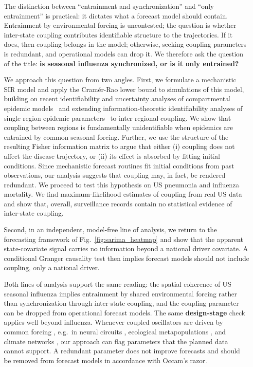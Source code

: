 \documentclass[11pt]{article}
\begin{document}
The distinction between ``entrainment and synchronization'' and ``only
entrainment'' is practical: it dictates what a forecast model should
contain. Entrainment by environmental forcing is uncontested; the
question is whether inter-state coupling contributes identifiable
structure to the trajectories. If it does, then coupling belongs in
the model; otherwise, seeking coupling parameters is redundant, and
operational models can drop it. We therefore ask the question of the
title: \textbf{is seasonal influenza synchronized, or is it only
  entrained?}


We approach this question from two angles. First, we formulate a
mechanistic SIR model and apply the Cram\'er-Rao lower bound to
simulations of this model, building on recent identifiability and
uncertainty analyses of compartmental epidemic
models~\citep{edeling2021, kharazmi2021} and extending
information-theoretic identifiability analyses of single-region
epidemic parameters~\citep{parag2022} to inter-regional coupling. We show that
coupling between regions is fundamentally unidentifiable when
epidemics are entrained by common seasonal forcing. Further, we use the structure of the
resulting Fisher information matrix to argue that either (i)
coupling does not affect the disease trajectory, or (ii) its
effect is absorbed by fitting initial conditions. Since mechanistic
forecast routines fit initial conditions from past observations, our
analysis suggests that coupling may, in fact, be rendered
redundant. We proceed to test
this hypothesis on US pneumonia and influenza mortality. We find
maximum-likelihood estimates of coupling from real US data and
show that, overall, surveillance records contain no statistical
evidence of inter-state coupling.

Second, in an independent, model-free line of analysis, we return to
the forecasting framework of Fig.~\ref{fig:sarima_heatmap} and show that
the apparent state-covariate signal carries no information beyond a
national driver covariate. A conditional Granger causality test
\citep{granger1969, geweke1984} then implies forecast models should not
include coupling, only a national driver.


Both lines of analysis support the same reading: the spatial
coherence of US seasonal influenza implies entrainment by shared
environmental forcing rather than synchronization through
inter-state coupling, and the coupling parameter can be dropped from
operational forecast models. The same \textbf{design-stage} check applies well beyond
influenza. Whenever coupled oscillators are driven by common forcing
\citep{pikovsky2001}, e.g.~in neural circuits
\citep{reid2019},
ecological metapopulations
\citep{bjornstad1999, grenfell1998},
and climate networks
\citep{tsonis2004architecture},
our approach can flag parameters that the planned data cannot
support. A redundant parameter does not improve forecasts and should
be removed from forecast models in accordance with Occam's razor.
\end{document}
